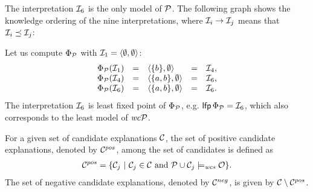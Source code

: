 \begin{definition}
\begin{tcolorbox}
\begin{example}
The interpretation $\mathcal{I}_6$ is the only model of $\mathcal{P}$. The following graph shows the knowledge ordering of the nine interpretations, where $\mathcal{I}_i \rightarrow \mathcal{I}_j$ means that $\mathcal{I}_i \preceq \mathcal{I}_j$:

\begin{center}
\end{center}

Let us compute $\Phi_{\mathcal{P}}$ with $\mathcal{I}_1 = \langle \emptyset, \emptyset \rangle$:
\[
\begin{array}{lclcl}
\Phi_{\mathcal{P}}(\mathcal{I}_1) & = & \langle \{b\}, \emptyset \rangle & = & \mathcal{I}_4, \\
\Phi_{\mathcal{P}}(\mathcal{I}_4) & = & \langle \{a, b\}, \emptyset \rangle & = & \mathcal{I}_6, \\
\Phi_{\mathcal{P}}(\mathcal{I}_6) & = & \langle \{a, b\}, \emptyset \rangle & = & \mathcal{I}_6.
\end{array}
\]
The interpretation $\mathcal{I}_6$ is least fixed point of $\Phi_{\mathcal{P}}$, e.g. $\mathsf{lfp}\, \Phi_{\mathcal{P}} = \mathcal{I}_6$, which also corresponds to the least model of $\mathit{wc}\mathcal{P}$.
\end{example}
\end{tcolorbox}
\vspace*{\fill}
\newpage

For a given set of candidate explanations $\mathcal{C}$, the set of positive candidate explanations, denoted by $\mathcal{C}^{pos}$, among the set of candidates is defined as  
\[
\begin{aligned}
\mathcal{C}^{pos} = \{\mathcal{C}_j \ | \ \mathcal{C}_j \in \mathcal{C} \mbox{ and } \mathcal{P} \cup \mathcal{C}_j \models_{\normalfont\textit{wcs}} \mathcal{O}\}.
\end{aligned}
\]
The set of negative candidate explanations, denoted by $\mathcal{C}^{neg}$, is given by $\mathcal{C}\setminus\mathcal{C}^{pos}$.
\end{definition}
